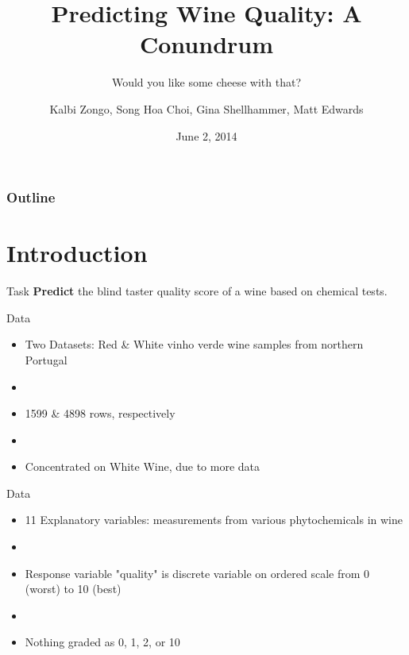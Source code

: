 \documentclass{beamer}
\title{Predicting Wine Quality: A Conundrum}
\subtitle{Would you like some cheese with that?}
\author{Kalbi Zongo, Song Hoa Choi, Gina Shellhammer, Matt Edwards}
\date{June 2, 2014}
\begin{document}
\begin{frame}
	\titlepage
\end{frame}

\begin{frame}
	\frametitle{Outline}
	\tableofcontents
\end{frame}

\section{Introduction}
\begin{frame}{Task}
	\LARGE
	\textbf{Predict} the blind taster quality score of a wine based on chemical tests.

\end{frame}

\begin{frame}{Data}
\begin{itemize}
	\item Two Datasets: Red \& White vinho verde wine samples from northern Portugal
	\item[]
	\item 1599 \& 4898 rows, respectively
	\item[]
	\item Concentrated on White Wine, due to more data
\end{itemize}
\end{frame}


\begin{frame}{Data}
\begin{itemize}
	
	\item 11 Explanatory variables: measurements from various phytochemicals in wine
	\item[]
	\item Response variable "quality" is discrete variable on ordered scale from 0 (worst) to 10 (best)
	\item[]
	\item Nothing graded as 0, 1, 2, or 10	
\end{itemize}
\end{frame}
\end{document}
